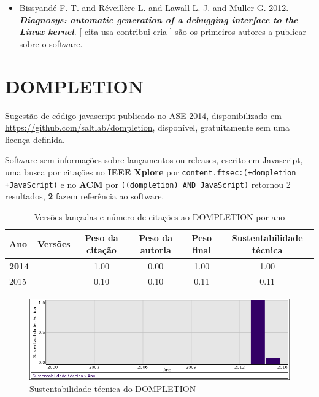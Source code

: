 \begin{itemize}
\item Bissyandé F. T. and Réveillère L. and Lawall L. J. and Muller G.
      2012.
        \textbf{\textit{ Diagnosys: automatic generation of a debugging interface to the Linux kernel}}.
      [
          cita
          usa
          contribui
          cria
      ]
são os primeiros autores a publicar sobre o software.
\end{itemize}
\section{DOMPLETION}

Sugestão de código javascript
publicado no ASE 2014,
disponibilizado em \url{https://github.com/saltlab/dompletion},
disponível,
gratuitamente
sem uma licença definida.

Software sem informações sobre lançamentos ou releases,
escrito em Javascript,
uma busca por citações no {\bf IEEE Xplore} por
\texttt{content.ftsec:(+dompletion +JavaScript)}
e no {\bf ACM} por
\texttt{((dompletion) AND JavaScript)}
retornou
2 resultados,
{\bf 2} fazem referência ao software.


\begin{table}[H]
\caption{Versões lançadas e número de citações ao DOMPLETION por ano}
\centering
\begin{tabular}{| l | c | c | c | c | c |}
  \hline
  Ano & Versões & Peso da citação & Peso da autoria & Peso final & Sustentabilidade técnica \\
  \hline
            {\bf 2014}
          &
          
          &
          1.00
          &
          0.00
          &
          1.00
          &
            {\color{blue} 1.00}
          \\
\hline
            2015
          &
          
          &
          0.10
          &
          0.10
          &
          0.11
          &
            {\color{red} 0.11}
          \\
\hline
\end{tabular}
\end{table}

\begin{figure}[h]
  \center
  \includegraphics[scale=0.50]{result-documents/charts/dompletion.png}
  \caption{Sustentabilidade técnica do DOMPLETION}
\end{figure}


